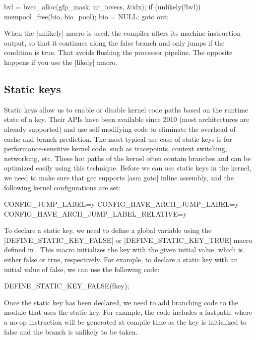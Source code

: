 \documentclass[10pt, oneside]{book}
\begin{document}
\begin{code}
bvl = bvec_alloc(gfp_mask, nr_iovecs, &idx);
if (unlikely(!bvl)) {
    mempool_free(bio, bio_pool);
    bio = NULL;
    goto out;
}
\end{code}

When the \cpp|unlikely| macro is used, the compiler alters its machine instruction output, so that it continues along the false branch and only jumps if the condition is true.
That avoids flushing the processor pipeline.
The opposite happens if you use the \cpp|likely| macro.

\subsection{Static keys}
\label{sec:static_keys}
Static keys allow us to enable or disable kernel code paths based on the runtime state of a key.
Their APIs have been available since 2010 (most architectures are already supported) and use self-modifying code to eliminate the overhead of cache and branch prediction.
The most typical use case of static keys is for performance-sensitive kernel code, such as tracepoints, context switching, networking, etc. These hot paths of the kernel often contain branches and can be optimized easily using this technique.
Before we can use static keys in the kernel, we need to make sure that gcc supports \cpp|asm goto| inline assembly, and the following kernel configurations are set:

\begin{code}
CONFIG_JUMP_LABEL=y
CONFIG_HAVE_ARCH_JUMP_LABEL=y
CONFIG_HAVE_ARCH_JUMP_LABEL_RELATIVE=y
\end{code}

To declare a static key, we need to define a global variable using the \cpp|DEFINE_STATIC_KEY_FALSE| or \cpp|DEFINE_STATIC_KEY_TRUE| macro defined in .
This macro initializes the key with the given initial value, which is either false or true, respectively. For example, to declare a static key with an initial value of false, we can use the following code:

\begin{code}
DEFINE_STATIC_KEY_FALSE(fkey);
\end{code}

Once the static key has been declared, we need to add branching code to the module that uses the static key.
For example, the code includes a fastpath, where a no-op instruction will be generated at compile time as the key is initialized to false and the branch is unlikely to be taken.
\end{document}
